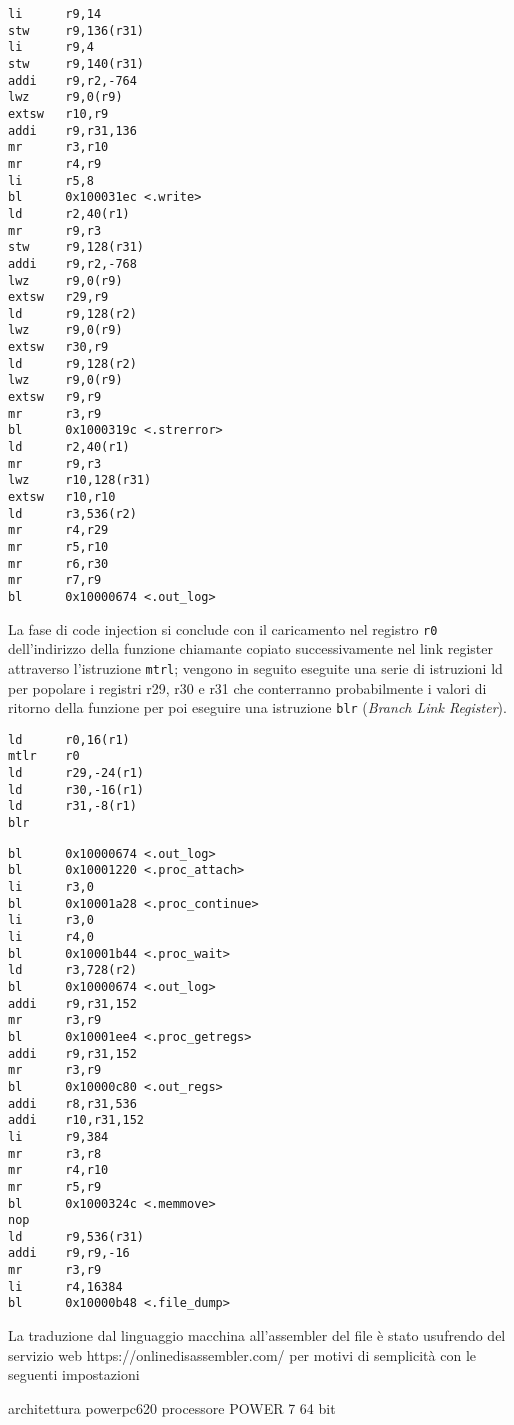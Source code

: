 \documentclass[10pt,a4paper, titlepage]{report}
\begin{document}
\begin{lstlisting}
li      r9,14
stw     r9,136(r31)
li      r9,4
stw     r9,140(r31)
addi    r9,r2,-764
lwz     r9,0(r9)
extsw   r10,r9
addi    r9,r31,136
mr      r3,r10
mr      r4,r9
li      r5,8
bl      0x100031ec <.write>
ld      r2,40(r1)
mr      r9,r3
stw     r9,128(r31)
addi    r9,r2,-768
lwz     r9,0(r9)
extsw   r29,r9
ld      r9,128(r2)
lwz     r9,0(r9)
extsw   r30,r9
ld      r9,128(r2)
lwz     r9,0(r9)
extsw   r9,r9
mr      r3,r9
bl      0x1000319c <.strerror>
ld      r2,40(r1)
mr      r9,r3
lwz     r10,128(r31)
extsw   r10,r10
ld      r3,536(r2)
mr      r4,r29
mr      r5,r10
mr      r6,r30
mr      r7,r9
bl      0x10000674 <.out_log>
\end{lstlisting}

La fase di code injection si conclude con il caricamento nel registro \texttt{r0} dell'indirizzo della funzione chiamante copiato successivamente nel link register attraverso l'istruzione \texttt{mtrl}; vengono in seguito eseguite una serie di istruzioni ld per popolare i registri r29, r30 e r31 che conterranno probabilmente i valori di ritorno della funzione per poi eseguire una istruzione \texttt{blr} (\textit{Branch Link Register}).

\begin{lstlisting}
ld      r0,16(r1)
mtlr    r0
ld      r29,-24(r1)
ld      r30,-16(r1)
ld      r31,-8(r1)
blr
\end{lstlisting}


\begin{lstlisting}
bl      0x10000674 <.out_log>
bl      0x10001220 <.proc_attach>
li      r3,0
bl      0x10001a28 <.proc_continue>
li      r3,0
li      r4,0
bl      0x10001b44 <.proc_wait>
ld      r3,728(r2)
bl      0x10000674 <.out_log>
addi    r9,r31,152
mr      r3,r9
bl      0x10001ee4 <.proc_getregs>
addi    r9,r31,152
mr      r3,r9
bl      0x10000c80 <.out_regs>
addi    r8,r31,536
addi    r10,r31,152
li      r9,384
mr      r3,r8
mr      r4,r10
mr      r5,r9
bl      0x1000324c <.memmove>
nop
ld      r9,536(r31)
addi    r9,r9,-16
mr      r3,r9
li      r4,16384
bl      0x10000b48 <.file_dump>
\end{lstlisting}






La traduzione dal linguaggio macchina all'assembler del file è stato usufrendo del servizio web https://onlinedisassembler.com/ per motivi di semplicità con le seguenti impostazioni

architettura powerpc620
processore POWER 7
64 bit
\end{document}
